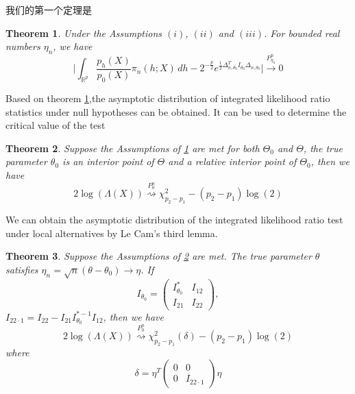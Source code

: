 \documentclass[review]{elsarticle}
\newtheorem{theorem}{Theorem}
\begin{document}
我们的第一个定理是

\begin{theorem}\label{theoremMain}
    Under the Assumptions $(i)$, $(ii)$ and $(iii)$. For bounded real numbers $\eta_n$, we have
    \begin{equation}
        \Big|\int_{\mathbb{R}^{p}}\frac{p_h(X)}{p_0(X)}\pi_n(h;X)\,dh-
        2^{-\frac{p}{2}}e^{\frac{1}{2}\Delta_{n,\theta_0}^TI_{\theta_0}\Delta_{n,\theta_0}}
        \Big|\xrightarrow{P_{\eta_n}^n}0
    \end{equation}
\end{theorem}


Based on theorem \ref{theoremMain},the asymptotic distribution of integrated likelihood ratio statistics under null hypotheses can be obtained. It can be used to determine the critical value of the test
\begin{theorem}\label{theoremWilks}
    Suppose the Assumptions of \ref{theoremMain} are met for both $\Theta_0$ and $\Theta$,  the true parameter $\theta_0$ is an interior point of $\Theta$ and a relative interior point of $\Theta_0$, then we have
\begin{equation}
    2\log(\Lambda(X))\overset{P_0^n}{\rightsquigarrow} \chi^2_{p_2-p_1}-(p_2-p_1)\log(2)
\end{equation}

\end{theorem}

We can obtain the asymptotic distribution of the integrated likelihood ratio test under local alternatives by Le Cam's third lemma.
\begin{theorem}   \label{theoremPower}
Suppose  the Assumptions of \ref{theoremWilks} are met. The true parameter $\theta$ satisfies $\eta_n=\sqrt{n}(\theta-\theta_0)\to \eta$. If
\begin{equation}
    I_{\theta_0}=\left(
        \begin{matrix}
            I^*_{\theta_0}&I_{12}
            \\
            I_{21}&I_{22}
        \end{matrix}
    \right),
\end{equation}
$I_{22\cdot 1}=I_{22}-I_{21}I_{\theta_0}^{*-1}I_{12}$,
    then we have
\begin{equation}
    2\log(\Lambda(X))\overset{P_0^n}{\rightsquigarrow} \chi^2_{p_2-p_1}(\delta)-(p_2-p_1)\log(2)
\end{equation}
where
\begin{equation}
\delta=\eta^T
    \left(
        \begin{matrix}
            0&0\\
            0&I_{22\cdot 1}
        \end{matrix}
    \right)
    \eta
\end{equation}
\end{theorem}
\end{document}
